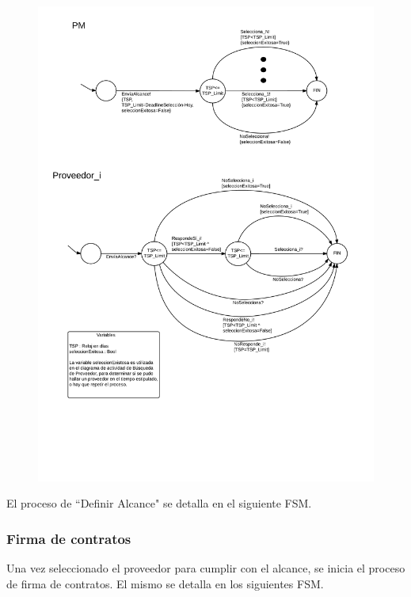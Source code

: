 \begin{figure}[H]
\includegraphics[width=\linewidth]{diag/nuevos/fsm-selprov.png}
\label{fsm-selprov}
\end{figure}

El proceso de ``Definir Alcance" se detalla en el siguiente FSM. 

		\subsubsection{Firma de contratos}
Una vez seleccionado el proveedor para cumplir con el alcance, se inicia 
el proceso de firma de contratos. El mismo se detalla en los siguientes FSM. 

